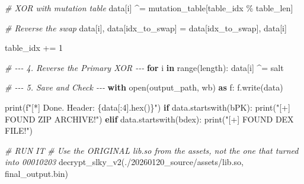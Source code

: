 \documentclass[
]{article}
\newenvironment{Shaded}{}{}
\newcommand{\BuiltInTok}[1]{\textcolor[rgb]{0.00,0.50,0.00}{#1}}
\newcommand{\CommentTok}[1]{\textcolor[rgb]{0.38,0.63,0.69}{\textit{#1}}}
\newcommand{\ControlFlowTok}[1]{\textcolor[rgb]{0.00,0.44,0.13}{\textbf{#1}}}
\newcommand{\DecValTok}[1]{\textcolor[rgb]{0.25,0.63,0.44}{#1}}
\newcommand{\ImportTok}[1]{\textcolor[rgb]{0.00,0.50,0.00}{\textbf{#1}}}
\newcommand{\KeywordTok}[1]{\textcolor[rgb]{0.00,0.44,0.13}{\textbf{#1}}}
\newcommand{\NormalTok}[1]{#1}
\newcommand{\OperatorTok}[1]{\textcolor[rgb]{0.40,0.40,0.40}{#1}}
\newcommand{\SpecialCharTok}[1]{\textcolor[rgb]{0.25,0.44,0.63}{#1}}
\newcommand{\SpecialStringTok}[1]{\textcolor[rgb]{0.73,0.40,0.53}{#1}}
\newcommand{\StringTok}[1]{\textcolor[rgb]{0.25,0.44,0.63}{#1}}
\begin{document}
\begin{Shaded}
\begin{Highlighting}[]
        \CommentTok{\# XOR with mutation table}
\NormalTok{        data[i] }\OperatorTok{\^{}=}\NormalTok{ mutation\_table[table\_idx }\OperatorTok{\%}\NormalTok{ table\_len]}
        
        \CommentTok{\# Reverse the swap}
\NormalTok{        data[i], data[idx\_to\_swap] }\OperatorTok{=}\NormalTok{ data[idx\_to\_swap], data[i]}
        
\NormalTok{        table\_idx }\OperatorTok{+=} \DecValTok{1}

    \CommentTok{\# {-}{-}{-} 4. Reverse the Primary XOR {-}{-}{-}}
    \ControlFlowTok{for}\NormalTok{ i }\KeywordTok{in} \BuiltInTok{range}\NormalTok{(length):}
\NormalTok{        data[i] }\OperatorTok{\^{}=}\NormalTok{ salt}

    \CommentTok{\# {-}{-}{-} 5. Save and Check {-}{-}{-}}
    \ControlFlowTok{with} \BuiltInTok{open}\NormalTok{(output\_path, }\StringTok{\textquotesingle{}wb\textquotesingle{}}\NormalTok{) }\ImportTok{as}\NormalTok{ f:}
\NormalTok{        f.write(data)}
    
    \BuiltInTok{print}\NormalTok{(}\SpecialStringTok{f"[*] Done. Header: }\SpecialCharTok{\{}\NormalTok{data[:}\DecValTok{4}\NormalTok{]}\SpecialCharTok{.}\BuiltInTok{hex}\NormalTok{()}\SpecialCharTok{\}}\SpecialStringTok{"}\NormalTok{)}
    \ControlFlowTok{if}\NormalTok{ data.startswith(}\StringTok{b\textquotesingle{}PK\textquotesingle{}}\NormalTok{):}
        \BuiltInTok{print}\NormalTok{(}\StringTok{"[+] FOUND ZIP ARCHIVE!"}\NormalTok{)}
    \ControlFlowTok{elif}\NormalTok{ data.startswith(}\StringTok{b\textquotesingle{}dex\textquotesingle{}}\NormalTok{):}
        \BuiltInTok{print}\NormalTok{(}\StringTok{"[+] FOUND DEX FILE!"}\NormalTok{)}

\CommentTok{\# RUN IT}
\CommentTok{\# Use the ORIGINAL lib.so from the assets, not the one that turned into 00010203}
\NormalTok{decrypt\_slky\_v2(}\StringTok{\textquotesingle{}./20260120\_source/assets/lib.so\textquotesingle{}}\NormalTok{, }\StringTok{\textquotesingle{}final\_output.bin\textquotesingle{}}\NormalTok{)}
\end{Highlighting}
\end{Shaded}
\end{document}

